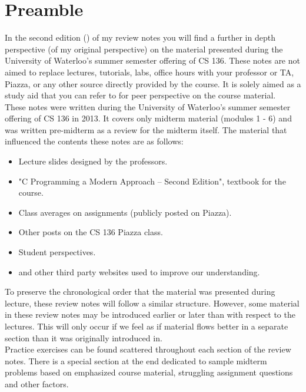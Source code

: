 \section*{Preamble}

In the second edition (\docbuild) of my review notes you will find a further in depth perspective (of my original perspective) on the material presented during the University of Waterloo's summer semester offering of CS 136. These notes are not aimed to replace lectures, tutorials, labs, office hours with your professor or TA, Piazza, or any other source directly provided by the course. It is solely aimed as a study aid that you can refer to for peer perspective on the course material.\\

These notes were written during the University of Waterloo's summer semester offering of CS 136 in 2013. It covers only midterm material (modules 1 - 6) and was written pre-midterm as a review for the midterm itself. The material that influenced the contents these notes are as follows:

\begin{itemize}

\item Lecture slides designed by the professors.
\item "C Programming a Modern Approach -- Second Edition", textbook for the course.
\item Class averages on assignments (publicly posted on Piazza).
\item Other posts on the CS 136 Piazza class.
\item Student perspectives.
\item and other third party websites used to improve our understanding.

\end{itemize}

To preserve the chronological order that the material was presented during lecture, these review notes will follow a similar structure. However, some material in these review notes may be introduced earlier or later than with respect to the lectures. This will only occur if we feel as if material flows better in a separate section than it was originally introduced in.\\

Practice exercises can be found scattered throughout each section of the review notes. There is a special section at the end dedicated to sample midterm problems based on emphasized course material, struggling assignment questions and other factors.

